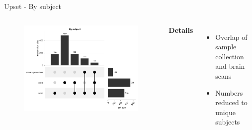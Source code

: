 \begin{frame}{Upset - By subject}
    \begin{columns}[c] %

    
        \begin{figure}
        \includegraphics[width=1\linewidth]{../figures/upset_scan_stool_bysybject.png}
        \end{figure}

    
        \textbf{Details}
        \begin{itemize}
            \item Overlap of sample collection and brain scans
            \item Numbers reduced to unique subjects
        \end{itemize}

    \end{columns}

\end{frame}


